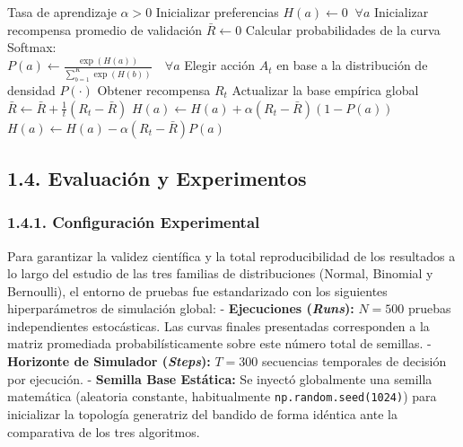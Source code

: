 \begin{algorithm}
\caption{Algoritmo de Variación de Gradiente de Preferencias}
\begin{algorithmic}[1]
\REQUIRE Tasa de aprendizaje $\alpha > 0$
\STATE Inicializar preferencias $H(a) \leftarrow 0 \;\; \forall a$ 
\STATE Inicializar recompensa promedio de validación $\bar{R} \leftarrow 0$
    \STATE Calcular probabilidades de la curva Softmax:\\
    $P(a) \leftarrow \frac{\exp(H(a))}{\sum_{b=1}^K \exp(H(b))} \quad \forall a$
    \STATE Elegir acción $A_t$ en base a la distribución de densidad $P(\cdot)$
    \STATE Obtener recompensa $R_t$
    \STATE Actualizar la base empírica global $\bar{R} \leftarrow \bar{R} + \frac{1}{t}(R_t - \bar{R})$
            \STATE $H(a) \leftarrow H(a) + \alpha(R_t - \bar{R})(1 - P(a))$
        \ELSE
            \STATE $H(a) \leftarrow H(a) - \alpha(R_t - \bar{R})P(a)$
        \ENDIF
    \ENDFOR
\ENDFOR
\end{algorithmic}
\end{algorithm}

\subsection{1.4. Evaluación y
Experimentos}\label{evaluaciuxf3n-y-experimentos}

\subsubsection{1.4.1. Configuración
Experimental}\label{configuraciuxf3n-experimental}

Para garantizar la validez científica y la total reproducibilidad de los
resultados a lo largo del estudio de las tres familias de distribuciones
(Normal, Binomial y Bernoulli), el entorno de pruebas fue estandarizado
con los siguientes hiperparámetros de simulación global: -
\textbf{Ejecuciones (\emph{Runs}):} \(N = 500\) pruebas independientes
estocásticas. Las curvas finales presentadas corresponden a la matriz
promediada probabilísticamente sobre este número total de semillas. -
\textbf{Horizonte de Simulador (\emph{Steps}):} \(T = 300\) secuencias
temporales de decisión por ejecución. - \textbf{Semilla Base Estática:}
Se inyectó globalmente una semilla matemática (aleatoria constante,
habitualmente \texttt{np.random.seed(1024)}) para inicializar la
topología generatriz del bandido de forma idéntica ante la comparativa
de los tres algoritmos.

